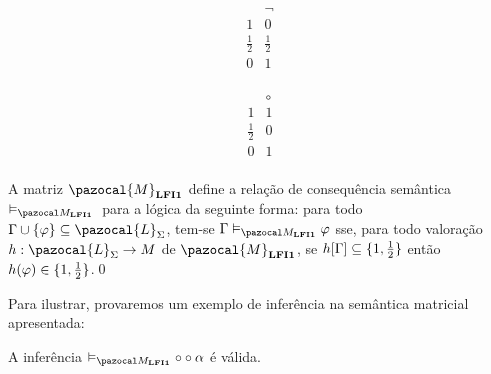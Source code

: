 \begin{definicao}
            \vspace{0.5cm}

            \begin{minipage}{0.4\textwidth}
                \[
                    \begin{array}{c|c}%
                                    & \neg        \\
                        \hline%
                        1           & 0           \\
                        \frac{1}{2} & \frac{1}{2} \\
                        0           & 1           \\
                    \end{array}
                \]
            \end{minipage}
            \begin{minipage}{0.3\textwidth}
                \[
                    \begin{array}{c|c}%
                                    & \circ   \\
                        \hline%
                        1           & 1         \\
                        \frac{1}{2} & 0         \\
                        0           & 1         \\
                    \end{array}
                \]
            \end{minipage}

            \vspace{\baselineskip}

            \noindent
            A matriz $\pazocal{M}_{\lfium{}}$ define a relação de consequência semântica $\conmat{}$ para a lógica \lfium{} da seguinte forma: para todo $\Gamma \cup \{\phi\} \subseteq \pazocal{L}_{\Sigma}$, tem-se $\Gamma \conmat \phi$ sse, para todo valoração $h : \pazocal{L}_{\Sigma} \to M$ de $\pazocal{M}_{\lfium{}}$, se $h[\Gamma] \subseteq \{1, \frac{1}{2}{}\}$ então $h(\varphi) \in \{1, \frac{1}{2}{}\}$.\qed{}
        \end{definicao}

        Para ilustrar, provaremos um exemplo de inferência na semântica matricial apresentada:

        \begin{exemplo}\label{ex:2}
            A inferência $ \conmat \circ \circ \alpha$ é válida.
        \end{exemplo}

